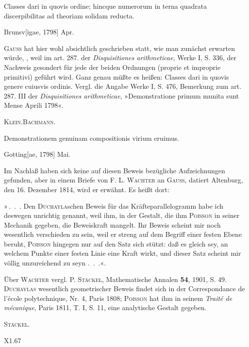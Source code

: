 \indent Classes dari in quovis ordine; hincque numerorum in terna quadrata discerpibilitas ad theoriam solidam reducta.
\par\noindent\hfill Brunsv[igae, 1798] Apr.

\medskip\begingroup\small
\indent \textsc{Gauss} hat hier wohl absichtlich  geschrieben statt, wie man zunächst erwarten würde, , weil im art. 287. der \textit{Disquisitiones arithmeticae}, Werke I, S. 336, der Nachweis gesondert für jede der beiden Ordnungen (proprie et improprie primitivi) geführt wird. Ganz genau müßte es heißen: Classes dari in quovis genere cuiusvis ordinis. Vergl. die Angabe Werke I, S. 476, Bemerkung zum art. 287. III der \textit{Disquisitiones arithmeticae}, »Demonstratione primum munita sunt Mense Aprili 1798«.
\par\noindent\hfill\textsc{Klein.}\quad\textsc{Bachmann.}
\par\endgroup

\indent Demonstrationem genuinam compositionis virium eruimus.
\par\noindent\hfill Gotting[ae, 1798] Mai.

\medskip\begingroup\small
\indent Im Nachlaß haben sich keine auf diesen Beweis bezügliche Aufzeichnungen gefunden, aber in einem Briefe von F. L. \textsc{Wachter} an \textsc{Gauss}, datiert Altenburg, den 16. Dezember 1814, wird er erwähnt. Es heißt dort:

»\,.\ .\ . Den \textsc{Duchayla}schen Beweis für das Kräfteparallelogramm habe ich deswegen unrichtig genannt, weil ihm, in der Gestalt, die ihm \textsc{Poisson} in seiner Mechanik gegeben, die Beweiskraft mangelt. Ihr Beweis scheint mir noch wesentlich verschieden zu sein, weil er streng auf dem Begriff einer festen Ebene beruht, \textsc{Poisson} hingegen  nur auf den Satz sich stützt: daß es gleich sey, an welchem Punkte einer festen Linie eine Kraft wirkt, und dieser Satz scheint mir völlig unzureichend zu seyn .\ .\ .«.

Über \textsc{Wachter} vergl. P. \textsc{Stäckel}, Mathematische Annalen \textbf{54}, 1901, S. 49. \textsc{Duchaylas} wesentlich geometrischer Beweis findet sich in der Correspondance de l'école polytechnique, Nr. 4, Paris 1808; \textsc{Poisson} hat ihm in seinem \textit{Traité de mécanique}, Paris 1811, T. I, S. 11, eine analytische Gestalt gegeben.
\par\noindent\hfill\textsc{Stäckel.}
\par\endgroup
\par\bigskip\noindent X1.\hfill67\hspace*{.14\linewidth}
